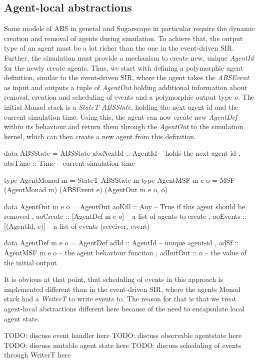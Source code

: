 \subsection{Agent-local abstractions}
Some models of ABS in general and Sugarscape in particular require the dynamic creation and removal of agents during simulation. To achieve that, the output type of an agent must be a lot richer than the one in the event-driven SIR. Further, the simulation must provide a mechanism to create new, unique \textit{AgentId} for the newly create agents. Thus, we start with defining a polymorphic agent definition, similar to the event-driven SIR, where the agent takes the \textit{ABSEvent} as input and outputs a tuple of \textit{AgentOut} holding additional information about removal, creation and scheduling of events and a polymorphic output type \textit{o}. The initial Monad stack is a \textit{StateT ABSState}, holding the next agent id and the current simulation time. Using this, the agent can now create new \textit{AgentDef} within its behaviour and return them through the \textit{AgentOut} to the simulation kernel, which can then create a new agent from this definition.

\begin{HaskellCode}
data ABSState = ABSState
  { absNextId :: AgentId -- holds the next agent id 
  , absTime   :: Time    -- current simulation time
  }

type AgentMonad m   = StateT ABSState m
type AgentMSF m e o = MSF (AgentMonad m) (ABSEvent e) (AgentOut m e o, o)

data AgentOut m e o = AgentOut
  { aoKill   :: Any              -- True if this agent should be removed 
  , aoCreate :: [AgentDef m e o] -- a list of agents to create
  , aoEvents :: [(AgentId, e)]   -- a list of events (receiver, event)
  }

data AgentDef m e o = AgentDef
  { adId      :: AgentId         -- unique agent-id
  , adSf      :: AgentMSF m e o  -- the agent behaviour function
  , adInitOut :: o               -- the value of the initial output
  }
\end{HaskellCode}

It is obvious at that point, that scheduling of events in this approach is implemented different than in the event-driven SIR, where the agents Monad stack had a \textit{WriterT} to write events to. The reason for that is that we treat agent-local abstractions different here because of the need to encapsulate local agent state.

TODO: discuss event handler here
TODO: discuss observable agentstate here
TODO: discuss mutable agent state here
TODO: discuss scheduling of events through WriterT here


